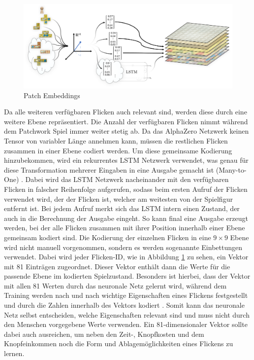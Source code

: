 \vspace*{-5cm}
\pagebreak

\begin{figure}[!ht]
    \centering
    \includegraphics[width=\textwidth]{res/pictures/patch-embeddings.png}
    \vspace*{-0.5cm}
    \caption{Patch Embeddings}
    \label{fig:patch-embeddings}
\end{figure}
\vspace*{-0.25cm}

Da alle weiteren verfügbaren Flicken auch relevant sind, werden diese durch eine weitere Ebene repräsentiert. Die Anzahl der verfügbaren Flicken nimmt während dem Patchwork Spiel immer weiter stetig ab. Da das AlphaZero Netzwerk keinen Tensor von variabler Länge annehmen kann, müssen die restlichen Flicken zusammen in einer Ebene codiert werden. Um diese gemeinsame Kodierung hinzubekommen, wird ein rekurrentes \ac{LSTM} Netzwerk verwendet, was genau für diese Transformation mehrerer Eingaben in eine Ausgabe gemacht ist (Many-to-One) \cite{2015.RNN}. Dabei wird das \ac{LSTM} Netzwerk nacheinander mit den verfügbaren Flicken in falscher Reihenfolge aufgerufen, sodass beim ersten Aufruf der Flicken verwendet wird, der der Flicken ist, welcher am weitesten von der Spielfigur entfernt ist. Bei jedem Aufruf merkt sich das \ac{LSTM} intern einen Zustand, der auch in die Berechnung der Ausgabe eingeht. So kann final eine Ausgabe erzeugt werden, bei der alle Flicken zusammen mit ihrer Position innerhalb einer Ebene gemeinsam kodiert sind. Die Kodierung der einzelnen Flicken in eine $9\times 9$ Ebene wird nicht manuell vorgenommen, sondern es werden sogenannte Einbettungen verwendet. Dabei wird jeder Flicken-\ac{ID}, wie in Abbildung \ref{fig:patch-embeddings} zu sehen, ein Vektor mit 81 Einträgen zugeordnet. Dieser Vektor enthält dann die Werte für die passende Ebene im kodierten Spielzustand. Besonders ist hierbei, dass der Vektor mit allen 81 Werten durch das neuronale Netz gelernt wird, \dash während dem Training werden nach und nach wichtige Eigenschaften eines Flickens festgestellt und durch die Zahlen innerhalb des Vektors kodiert \cite{2023.PytorchEmbedding}. Somit kann das neuronale Netz selbst entscheiden, welche Eigenschaften relevant sind und muss nicht durch den Menschen vorgegebene Werte verwenden. Ein 81-dimensionaler Vektor sollte dabei auch ausreichen, um neben den Zeit-, Knopfkosten und dem Knopfeinkommen noch die Form und Ablagemöglichkeiten eines Flickens zu lernen.

